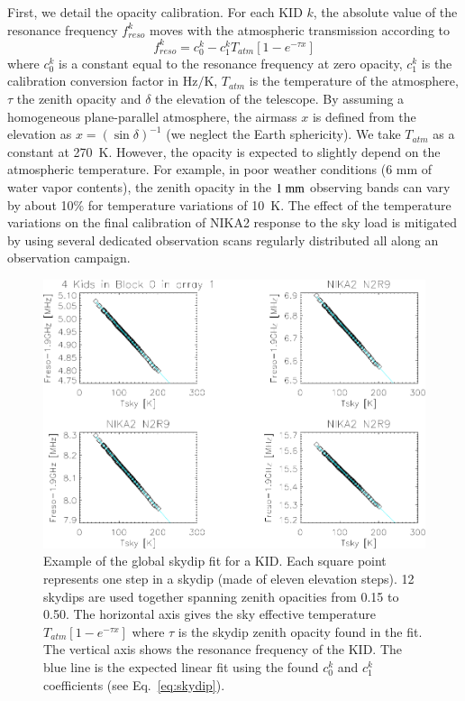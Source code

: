 First, we detail the opacity calibration. For each KID $k$, the
absolute value of the resonance frequency $f_{reso}^k$ moves with the
atmospheric transmission according to
%
\begin{equation}
f_{reso}^k  = c_0^k - c_1^k T_{atm}[1-e^{-\tau x}]
\label{eq:skydip}
\end{equation}
%
where $c_0^k$ is a constant equal to the resonance frequency at zero
opacity, $c_1^k$ is the calibration conversion factor in Hz$/$K,
$T_{atm}$ is the temperature of the atmosphere, $\tau$ the zenith
opacity and $\delta$ the elevation of the
telescope.  By assuming a homogeneous plane-parallel atmosphere, the
airmass $x$ is defined from the elevation as $x =
\left(\sin\delta\right)^{-1}$ (we neglect the Earth sphericity).
We take $T_{atm}$ as a constant at 270~K. However, the opacity is
expected to slightly depend on the atmospheric temperature. For
example, in poor weather conditions (6 mm of water vapor contents),
the zenith opacity in the $1~\rm{mm}$ observing bands can vary by
about 10\% for temperature variations of 10~K. The
effect of the temperature variations on the final
calibration of NIKA2 response to the sky load is mitigated by using
several dedicated observation scans regularly distributed all along an
observation campaign.
%
\begin{figure}[!thbp]
\begin{center}
\includegraphics[trim={9cm 0cm 0cm 6.5cm}, clip=true, width=\linewidth]{Figures/test_allskd4_N2R9v5_5-crop.pdf}
\caption[]{Example of the global skydip fit for a KID.
Each square point represents one step in a skydip (made of eleven
elevation steps). 12 skydips are used together spanning zenith
opacities from 0.15 to 0.50. The horizontal axis gives the sky
effective temperature $T_{atm}[1-e^{-\tau x}]$ where $\tau$ is the
skydip zenith opacity found in the fit. The vertical axis shows the
resonance frequency of the KID. The blue line is the expected linear
fit using the found $c_0^k$ and $c_1^k$ coefficients (see
Eq.~\ref{eq:skydip}).}
\label{fig:skydipfitexample}
\end{center}
\end{figure}


